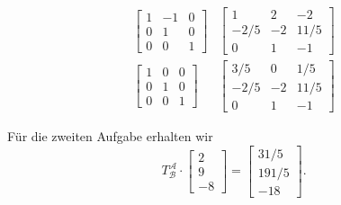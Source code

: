 \documentclass[fleqn,draft,a5paper]{article}
\theoremstyle{remark}
\begin{document}
\begin{align*}
  \begin{bmatrix}
    1 & -1 & 0 \\ 0 & 1 & 0 \\ 0 & 0 & 1
  \end{bmatrix}
  &
    \begin{bmatrix}
      1 & 2 & -2 \\ -2/5 & -2 & 11/5 \\ 0& 1 & -1
    \end{bmatrix}\\
  \begin{bmatrix}
    1 & 0 & 0 \\ 0 & 1 & 0 \\ 0 & 0 & 1
  \end{bmatrix}
  &
    \begin{bmatrix}
      3/5 & 0 & 1/5 \\ -2/5 & -2 & 11/5 \\ 0 & 1 & -1
    \end{bmatrix}
\end{align*}


Für die zweiten Aufgabe erhalten wir
\[T^{\mathcal{A}}_{\mathcal{B}} \cdot
  \begin{bmatrix}
    2 \\ 9 \\ -8
  \end{bmatrix}
  =
  \begin{bmatrix}
    31/5 \\ 191/5 \\ -18
  \end{bmatrix}.
\]
\end{document}
